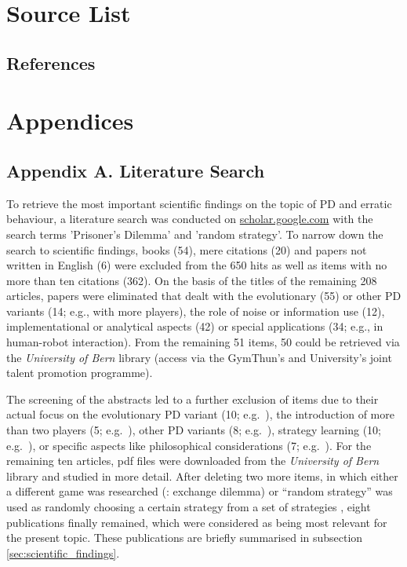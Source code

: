 \documentclass[11pt]{article}
\begin{document}
\section{Source List} \label{sec:sources}
\subsection*{References}
\printbibliography[title={}]

\newpage

\section{Appendices} \label{sec:appendices}
\subsection{Appendix A. Literature Search} \label{sec:Appx_search}
To retrieve the most important scientific findings on the topic of PD and erratic behaviour, a literature search was conducted on \url{scholar.google.com} with the search terms 'Prisoner's Dilemma' and 'random strategy'. 
To narrow down the search to scientific findings, books (54), mere citations (20) and papers not written in English (6) were excluded from the 650 hits as well as items with no more than ten citations (362).
On the basis of the titles of the remaining 208 articles, papers were eliminated that dealt with the evolutionary (55) or other PD variants (14; e.g., with more players), the role of noise or information use (12), implementational or analytical aspects (42) or special applications (34; e.g., in human-robot interaction). 
From the remaining 51 items, 50 could be retrieved via the \textit{University of Bern} library (access via the GymThun's and University’s joint talent promotion programme). 

The screening of the abstracts led to a further exclusion of items due to their actual focus on the evolutionary PD variant (10; e.g.~\cite{SSLP09}), the introduction of more than two players (5; e.g.~\cite{IGP04}), other PD variants (8; e.g.~\cite{HY98}), strategy learning (10; e.g.~\cite{HZX22}), or specific aspects like philosophical considerations (7; e.g.~\cite{McL81}). 
For the remaining ten articles, pdf files were downloaded from the \textit{University of Bern} library and studied in more detail.
After deleting two more items, in which either a different game was researched (\cite{BF06}: exchange dilemma) or “random strategy” was used as randomly choosing a certain strategy from a set of strategies \cite{CF23}, eight publications finally remained, which were considered as being most relevant for the present topic.
These publications are briefly summarised in subsection \ref{sec:scientific_findings}.
\end{document}
